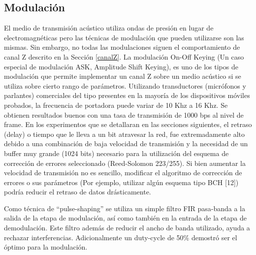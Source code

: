 \subsection{Modulación}
El medio de transmisión acústico utiliza ondas de presión en lugar de electromagnéticas pero las técnicas de modulación que pueden utilizarse son las mismas.
Sin embargo, no todas las modulaciones siguen el comportamiento de canal Z descrito en la Sección \ref{canalZ}.
La modulación On-Off Keying (Un caso especial de modulación ASK, Amplitude Shift Keying), es uno de los tipos de modulación que permite implementar un canal Z sobre un medio acústico si se utiliza sobre cierto rango de parámetros. Utilizando transductores (micrófonos y parlantes) comerciales del tipo presentes en la mayoría de los dispositivos móviles probados, la frecuencia de portadora puede variar de 10 Khz a 16 Khz. Se obtienen resultados buenos con una tasa de transmisión de 1000 bps al nivel de frame. En los experimentos que se detallaran en las secciones siguientes, el retraso (delay) o tiempo que le lleva a un bit atravesar la red, fue extremadamente alto debido a una combinación de baja velocidad de transmisión y la necesidad de un buffer muy grande (1024 bits) necesario para la utilización del esquema de corrección de errores seleccionado (Reed-Solomon 223/255). Si bien aumentar la velocidad de transmisión no es sencillo, modificar el algoritmo de corrección de errores o sus parámetros (Por ejemplo, utilizar algún esquema tipo BCH [12]) podría reducir el retraso de datos drásticamente.

Como técnica de ``pulse-shaping'' se utiliza un simple filtro FIR pasa-banda a la salida de la etapa de modulación, así como también en la entrada de la etapa de demodulación. Este filtro además de reducir el ancho de banda utilizado, ayuda a rechazar interferencias.
Adicionalmente un duty-cycle de 50\% demostró ser el óptimo para la modulación.

